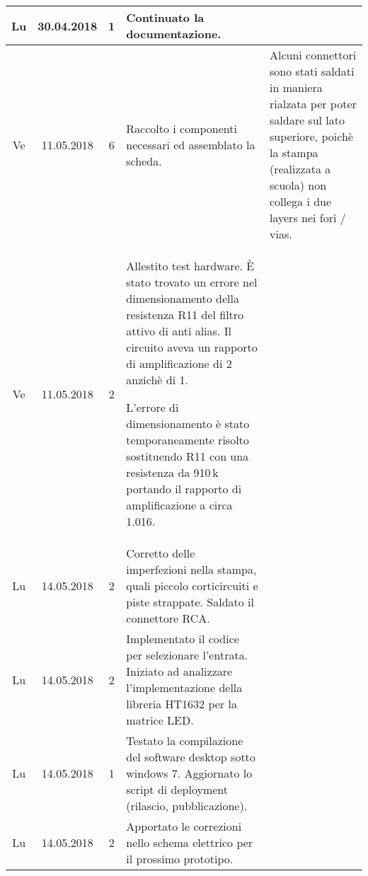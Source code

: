 \documentclass[a4paper]{article}
\newcommand{\journalentry}[5]{%
    #1 & #2 & #3 & #4 & #5 \\\hline
}
\begin{document}
\begin{tabularx}{\textwidth}{| c | c | c | p{} | X |}
        \journalentry{Lu}{30.04.2018}{1}{
            Continuato la documentazione.
        }{}

        \journalentry{Ve}{11.05.2018}{6}{
            Raccolto i componenti necessari ed assemblato la scheda.
        }{
            Alcuni connettori sono stati saldati in maniera rialzata per poter 
            saldare sul lato superiore, poich\`e la stampa (realizzata a scuola)
            non collega i due layers nei fori / vias.
        }

        \journalentry{Ve}{11.05.2018}{2}{
            Allestito test hardware.
            \`E stato trovato un errore nel dimensionamento della resistenza 
            R11 del filtro attivo di anti alias. Il circuito aveva un rapporto
            di amplificazione di 2 anzich\`e di 1.

            L'errore di dimensionamento \`e stato temporaneamente risolto 
            sostituendo R11 con una resistenza da 910\,k portando il rapporto
            di amplificazione a circa 1.016.
        }{
        }

        \journalentry{Lu}{14.05.2018}{2}{
            Corretto delle imperfezioni nella stampa, quali piccolo corticircuiti
            e piste strappate. Saldato il connettore RCA.
        }{}

        \journalentry{Lu}{14.05.2018}{2}{
            Implementato il codice per selezionare l'entrata.
            Iniziato ad analizzare l'implementazione della libreria HT1632 per
            la matrice LED.
        }{}

        \journalentry{Lu}{14.05.2018}{1}{
            Testato la compilazione del software desktop sotto windows 7.
            Aggiornato lo script di deployment (rilascio, pubblicazione).
        }{}

        \journalentry{Lu}{14.05.2018}{2}{
            Apportato le correzioni nello schema elettrico per il prossimo
            prototipo.
        }{}


    \end{tabularx}
\end{document}
